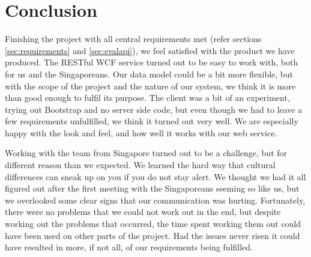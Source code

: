 \section{Conclusion}
Finishing the project with all central requirements met (refer sections
\ref{sec:requirements} and \ref{sec:evalapi}), we feel satisfied with the product
we have produced. 
The RESTful WCF service turned out to be easy to work with,
both for us and the Singaporeans. Our data model could be a bit more flexible, but
with the scope of the project and the nature of our system, we think it is more than good
enough to fulfil its purpose.
The client was a bit of an experiment, trying out Bootstrap and no server side code,
but even though we had to leave a few requirements unfulfilled, we think it 
turned out very well. We are especially happy with the look and feel, and how well it works with our web service.

Working with the team from Singapore turned out to be a challenge, but for 
different reason than we expected. We learned the hard way that 
cultural differences can sneak up on you if you do not stay alert. We
thought we had it all figured out after the first meeting with the Singaporeans
seeming so like us, but we overlooked some clear signs that our communication
was hurting.
Fortunately, there were no problems that we could not work out in the end, but
despite working out the problems that occurred, the time spent working them out
could have been used on other parts of the project. 
Had the issues never risen it could have resulted in more, if not all, of our requirements being fulfilled.

